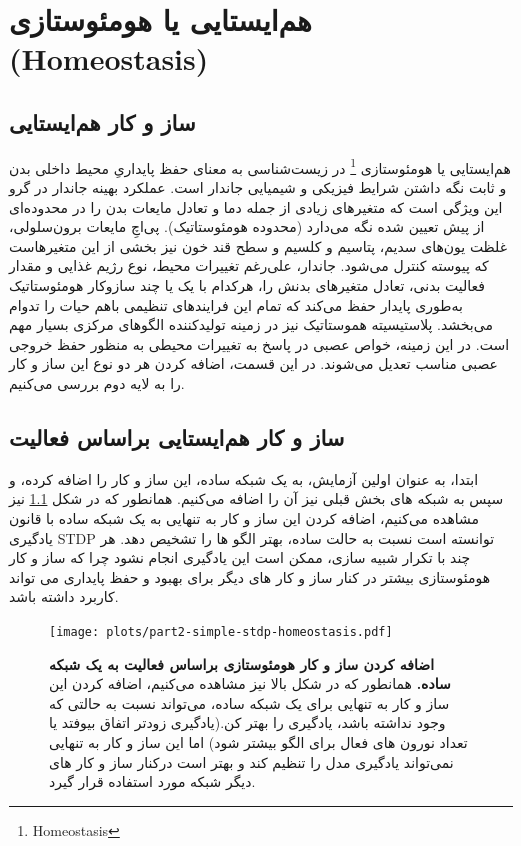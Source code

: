 \chapter{هم‌ایستایی یا هومئوستازی (Homeostasis)}
\section{ساز و کار هم‌ایستایی}
    هم‌ایستایی یا هومئوستازی
    \footnote{Homeostasis}
    در زیست‌شناسی به معنای حفظ پایداریِ محیط داخلی بدن و ثابت نگه داشتن شرایط فیزیکی و شیمیایی جاندار است. عملکرد بهینه جاندار در گرو این ویژگی است که متغیرهای زیادی از جمله دما و تعادل مایعات بدن را در محدوده‌ای از پیش تعیین شده نگه می‌دارد 
    (محدوده هومئوستاتیک). 
    پی‌اچِ مایعات برون‌سلولی، غلظت یون‌های سدیم، پتاسیم و کلسیم و سطح قند خون نیز بخشی از این متغیرهاست که پیوسته کنترل می‌شود. جاندار، علی‌رغم تغییرات محیط، نوع رژیم غذایی و مقدار فعالیت بدنی، تعادل متغیرهای بدنش را، هرکدام با یک یا چند سازوکار هومئوستاتیک به‌طوری پایدار حفظ می‌کند که تمام این فرایندهای تنظیمی باهم حیات را تدوام می‌بخشد. 
    پلاستیسیته هموستاتیک نیز در زمینه تولیدکننده الگوهای مرکزی بسیار مهم است. در این زمینه، خواص عصبی در پاسخ به تغییرات محیطی به منظور حفظ خروجی عصبی مناسب تعدیل می‌شوند.
    در این قسمت، اضافه کردن هر دو نوع این ساز و کار را به لایه دوم بررسی می‌کنیم. 
    \section{ساز و کار هم‌ایستایی براساس فعالیت}
    ابتدا، به عنوان اولین آزمایش، به یک شبکه ساده، این ساز و کار را اضافه کرده، و سپس به شبکه های بخش قبلی نیز آن را اضافه می‌کنیم. همانطور که در شکل 
    \ref{fig:part2-simple-stdp-homeostasis}
    نیز مشاهده می‌کنیم، اضافه کردن این ساز و کار به تنهایی به یک شبکه ساده با قانون یادگیری 
    STDP 
    توانسته است نسبت به حالت ساده، بهتر الگو ها را تشخیص دهد. هر چند با تکرار شبیه سازی، ممکن است این یادگیری انجام نشود چرا که ساز و کار هومئوستازی بیشتر در کنار ساز و کار های دیگر برای بهبود و حفظ پایداری می تواند کاربرد داشته باشد.

    \begin{figure}[!ht]
        \centering
        \texttt{[image: plots/part2-simple-stdp-homeostasis.pdf]} 
        \captionsetup{width=.9\linewidth}
        \caption{\textbf{اضافه کردن ساز و کار هومئوستازی براساس فعالیت به یک شبکه ساده.} همانطور که در شکل بالا نیز مشاهده می‌کنیم، اضافه کردن این ساز و کار به تنهایی برای یک شبکه ساده، می‌تواند نسبت به حالتی که وجود نداشته باشد، یادگیری را بهتر کن.(یادگیری زودتر اتفاق بیوفتد یا تعداد نورون های فعال برای الگو بیشتر شود) 
        اما این ساز و کار به تنهایی نمی‌تواند یادگیری مدل را تنظیم کند و بهتر است درکنار ساز و کار های دیگر شبکه مورد استفاده قرار گیرد.}
        \label{fig:part2-simple-stdp-homeostasis}
    \end{figure}

